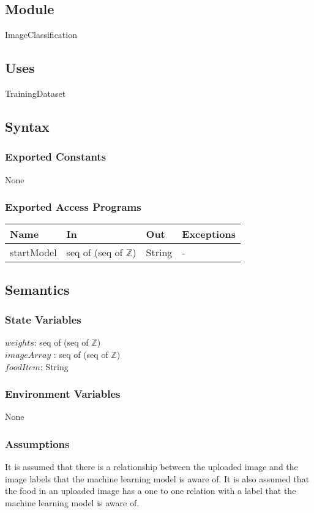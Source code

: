 \documentclass[12pt, titlepage]{article}
\begin{document}
\subsection{Module}
ImageClassification
\subsection{Uses}
TrainingDataset
\subsection{Syntax}
\subsubsection{Exported Constants}
None
\subsubsection{Exported Access Programs}
\begin{center}
\begin{tabular}{p{2cm} p{4cm} p{4cm} p{2cm}}
\hline
\textbf{Name} & \textbf{In} & \textbf{Out} & \textbf{Exceptions} \\
\hline
startModel & seq of (seq of $\mathbb{Z}$) & String & - \\
\hline
\end{tabular}
\end{center}
\subsection{Semantics}
\subsubsection{State Variables}
$weights$: seq of (seq of $\mathbb{Z}$)\\
$imageArray$ : seq of (seq of $\mathbb{Z}$)\\
$foodItem$: String
\subsubsection{Environment Variables}
None
\subsubsection{Assumptions}
It is assumed that there is a relationship between the uploaded image and the image labels that the machine learning model is aware of. It is also assumed that the food in an uploaded image has a one to one relation with a label that the machine learning model is aware of.
\end{document}
